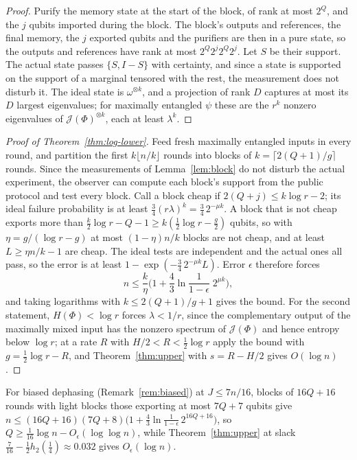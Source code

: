 \documentclass[11pt,a4paper]{article}
\theoremstyle{plain}
\theoremstyle{definition}
\theoremstyle{remark}
\begin{document}
\begin{proof}
Purify the memory state at the start of the block, of rank at most $2^Q$, and the $j$ qubits imported during the block. The
block's outputs and references, the final memory, the $j$ exported qubits and the purifiers are then in a pure state, so the
outputs and references have rank at most $2^Q2^j2^Q2^j$. Let $S$ be their support. The actual state passes $\{S,I-S\}$ with
certainty, and since a state is supported on the support of a marginal tensored with the rest, the measurement does not
disturb it. The ideal state is $\omega^{\otimes k}$, and a projection of rank $D$ captures at most its $D$ largest eigenvalues; for
maximally entangled $\psi$ these are the $r^k$ nonzero eigenvalues of $\mathcal J(\Phi)^{\otimes k}$, each at least $\lambda^k$.
\end{proof}

\begin{proof}[Proof of Theorem~\ref{thm:log-lower}]
Feed fresh maximally entangled inputs in every round, and partition the first $k\lfloor n/k\rfloor$ rounds into blocks of
$k=\lceil2(Q+1)/g\rceil$ rounds. Since the measurements of Lemma~\ref{lem:block} do not disturb the actual experiment, the
observer can compute each block's support from the public protocol and test every block. Call a block cheap if
$2(Q+j)\le k\log r-2$; its ideal failure probability is at least $\frac34(r\lambda)^k=\frac34\,2^{-\mu k}$. A block that is not cheap
exports more than $\frac k2\log r-Q-1\ge k(\frac12\log r-\frac g2)$ qubits, so with $\eta=g/(\log r-g)$ at most $(1-\eta)n/k$ blocks are
not cheap, and at least $L\ge\eta n/k-1$ are cheap. The ideal tests are independent and the actual ones all pass, so the
error is at least $1-\exp(-\frac34\,2^{-\mu k}L)$. Error $\epsilon$ therefore forces
\[
n\le\frac k\eta\Big(1+\frac43\ln\frac1{1-\epsilon}\;2^{\mu k}\Big),
\]
and taking logarithms with $k\le2(Q+1)/g+1$ gives the bound. For the second statement, $H(\Phi)<\log r$ forces $\lambda<1/r$,
since the complementary output of the maximally mixed input has the nonzero spectrum of $\mathcal J(\Phi)$ and hence entropy
below $\log r$; at a rate $R$ with $H/2<R<\frac12\log r$ apply the bound with $g=\frac12\log r-R$, and Theorem~\ref{thm:upper} with
$s=R-H/2$ gives $O(\log n)$.
\end{proof}

For biased dephasing (Remark~\ref{rem:biased}) at $J\le7n/16$, blocks of $16Q+16$ rounds with light blocks those exporting at
most $7Q+7$ qubits give $n\le(16Q+16)(7Q+8)\big(1+\frac43\ln\frac1{1-\epsilon}\,2^{16Q+16}\big)$, so
$Q\ge\frac1{16}\log n-O_\epsilon(\log\log n)$, while Theorem~\ref{thm:upper} at slack $\frac7{16}-\frac12h_2(\frac14)\approx0.032$ gives
$O_\epsilon(\log n)$.
\end{document}
